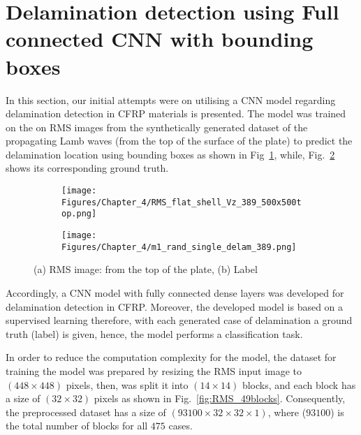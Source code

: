 \section{Delamination detection using Full connected CNN with bounding boxes}
\label{sec42}

In this section, our initial attempts were on utilising a CNN model regarding delamination detection in CFRP materials is presented.
The model was trained on the on RMS images from the synthetically generated dataset of the propagating Lamb waves (from the top of the surface of the plate) to predict the delamination location using bounding boxes as shown in Fig~\ref{fig:RMS_14}, while, Fig.~\ref{fig:label_14} shows its corresponding ground truth.
\begin{figure} [h!]
	\centering
	\begin{subfigure}[b]{0.47\textwidth}
		\centering
		\texttt{[image: Figures/Chapter\_4/RMS\_flat\_shell\_Vz\_389\_500x500top.png]}
		\caption{}
		\label{fig:RMS_14}
	\end{subfigure}
	\hfill
	\begin{subfigure}[b]{0.47\textwidth}
		\centering
		\texttt{[image: Figures/Chapter\_4/m1\_rand\_single\_delam\_389.png]}
		\caption{}
		\label{fig:label_14}
	\end{subfigure}
	\caption{(a) RMS image: from the top of the plate, (b) Label}
	\label{fig:RMS_GT}
\end{figure} 

Accordingly, a CNN model with fully connected dense layers was developed for delamination detection in CFRP.
Moreover, the developed model is based on a supervised learning therefore, with each generated case of delamination a ground truth (label) is given, hence, the model performs a classification task. 

In order to reduce the computation complexity for the model, the dataset for training the model was prepared by resizing the RMS input image to \((448\times 448)\) pixels,  then, was split it into \((14\times 14)\) blocks, and each block has a size of \((32\times 32)\) pixels as shown in Fig.~\ref{fig:RMS_49blocks}.
Consequently, the preprocessed dataset has a size of \((93100\times 32\times 32 \times 1)\), where (\(93100\)) is the total number of blocks for all \(475\) cases.

